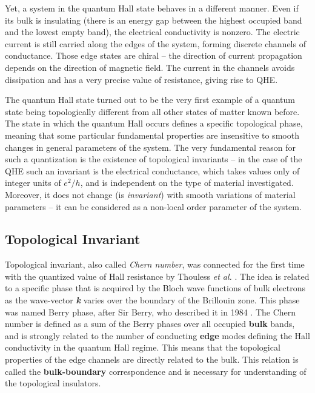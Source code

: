 \documentclass[titlepage,a4paper]{book}
\newcommand{\wciecie}{\quad\phantom{v}}
\begin{document}
Yet, a system in the quantum Hall state behaves in a different manner. Even if its bulk is insulating (there is an energy gap between the highest occupied band and the lowest empty band), the electrical conductivity is nonzero. The electric current is still carried along the edges of the system, forming discrete channels of conductance. Those edge states are chiral -- the direction of current propagation depends on the direction of magnetic field. The current in the channels avoids dissipation and has a very precise value of resistance, giving rise to QHE. 

The quantum Hall state turned out to be the very first example of a quantum state being topologically different from all other states of matter known before. The state in which the quantum Hall occurs defines a specific topological phase, meaning that some particular fundamental properties are insensitive to smooth changes in general parameters of the system. The very fundamental reason for such a quantization is the existence of topological invariants -- in the case of the QHE such an invariant is the electrical conductance, which takes values only of integer units of $e^2/h$, and is independent on the type of material investigated. Moreover, it does not change (is \textit{invariant}) with smooth variations of material parameters -- it can be considered as a non-local order parameter of the system.  

\subsection{Topological Invariant}
\wciecie
Topological invariant, also called \textit{Chern number}, was connected for the first time with the quantized value of Hall resistance by Thouless \textit{et al.} \cite{Thouless_Topology}. The idea is related to a specific phase that is acquired by the Bloch wave functions of bulk electrons as the wave-vector \textbf{\textit{k}} varies over the boundary of the Brillouin zone. This phase was named Berry phase, after Sir Berry, who described it in 1984 \cite{Berry_phase}. The Chern number is defined as a sum of the Berry phases over all occupied \textbf{bulk} bands, and is strongly related to the number of conducting \textbf{edge} modes defining the Hall conductivity in the quantum Hall regime. This means that the topological properties of the edge channels are directly related to the bulk. This relation is called the \textbf{bulk-boundary} correspondence and is necessary for understanding of the topological insulators.
\end{document}
